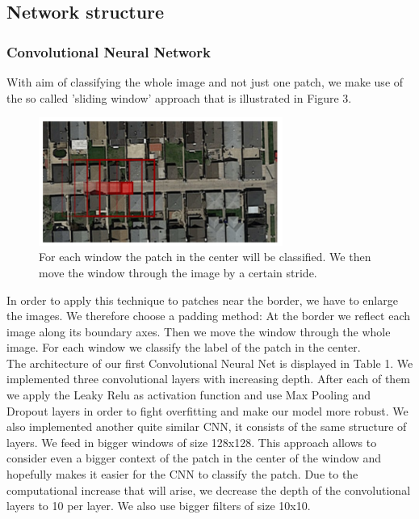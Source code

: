 \documentclass[10pt,conference,compsocconf]{IEEEtran}
\begin{document}
\subsection{Network structure}

\subsubsection{Convolutional Neural Network}
\label{cnn}

With aim of classifying the whole image and not just one patch, we make use of the so called 'sliding window' approach that is illustrated in Figure 3.


\begin{figure}[htbp]
	\centering
	\includegraphics[width=8cm]{images/slidingwindow.png}
	\caption{For each window the patch in the center will be classified. We then move the window through the image by a certain stride.}
	\vspace{-3mm}
	\label{fig:slidwindo}
\end{figure}

In order to apply this technique to patches near the border, we have to enlarge the images. We therefore choose a padding method: At the border we reflect each image along its boundary axes. Then we move the window through the whole image. For each window we classify the label of the patch in the center. 
\\


The architecture of our first Convolutional Neural Net is displayed in Table 1. We implemented three convolutional layers with increasing depth. After each of them we apply the Leaky Relu as activation function and use Max Pooling and Dropout layers in order to fight overfitting and make our model more robust. We also implemented another quite similar CNN, it consists of the same structure of layers. We feed in bigger windows of size 128x128. This approach allows to consider even a bigger context of the patch in the center of the window and hopefully makes it easier for the CNN to classify the patch. Due to the computational increase that will arise, we decrease the depth of the convolutional layers to 10 per layer. We also use bigger filters of size 10x10.
\\
\end{document}
